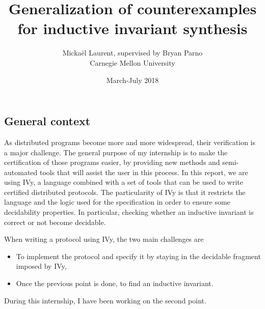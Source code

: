 \documentclass{article}
\newenvironment{point}[1]%
{\subsection*{#1}}%
{}
\begin{document}

\title{Generalization of counterexamples for inductive invariant synthesis}

\author{Mickaël Laurent, supervised by Bryan Parno\\Carnegie Mellon University}

\date{March-July 2018}

\maketitle

\pagestyle{empty} %
\thispagestyle{empty}


\begin{point}{General context}
  
  As distributed programs become more and more widespread, their verification is a major challenge.
  The general purpose of my internship is to make the certification of those programs easier, by providing new methods and semi-automated tools that will assist the user in this process.
  In this report, we are using IVy, a language combined with a set of tools that can be used to write certified distributed protocols.
  The particularity of IVy is that it restricts the language and the logic used for the specification in order to ensure some decidability properties.
  In particular, checking whether an inductive invariant is correct or not become decidable.

  When writing a protocol using IVy, the two main challenges are
  \begin{itemize}
    \item To implement the protocol and specify it by staying in the decidable fragment imposed by IVy,
    \item Once the previous point is done, to find an inductive invariant.
  \end{itemize}

  During this internship, I have been working on the second point.

\end{point}
\end{document}
